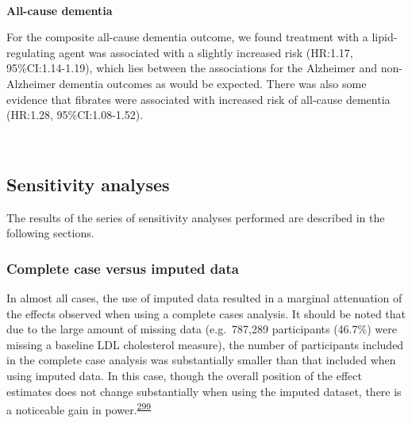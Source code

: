 \documentclass[a4paper, twoside]{templates/ociamthesis}
\begin{document}
~

\textbf{All-cause dementia}

For the composite all-cause dementia outcome, we found treatment with a lipid-regulating agent was associated with a slightly increased risk (HR:1.17, 95\%CI:1.14-1.19), which lies between the associations for the Alzheimer and non-Alzheimer dementia outcomes as would be expected. There was also some evidence that fibrates were associated with increased risk of all-cause dementia (HR:1.28, 95\%CI:1.08-1.52).

~

\hypertarget{sensitivity-analyses-1}{%
\subsection{Sensitivity analyses}\label{sensitivity-analyses-1}}

The results of the series of sensitivity analyses performed are described in the following sections.

\hypertarget{complete-case-versus-imputed-data}{%
\subsubsection{Complete case versus imputed data}\label{complete-case-versus-imputed-data}}

In almost all cases, the use of imputed data resulted in a marginal attenuation of the effects observed when using a complete cases analysis. It should be noted that due to the large amount of missing data (e.g.~787,289 participants (46.7\%) were missing a baseline LDL cholesterol measure), the number of participants included in the complete case analysis was substantially smaller than that included when using imputed data. In this case, though the overall position of the effect estimates does not change substantially when using the imputed dataset, there is a noticeable gain in power.\textsuperscript{\protect\hyperlink{ref-sterne2009}{299}}

~
\end{document}
